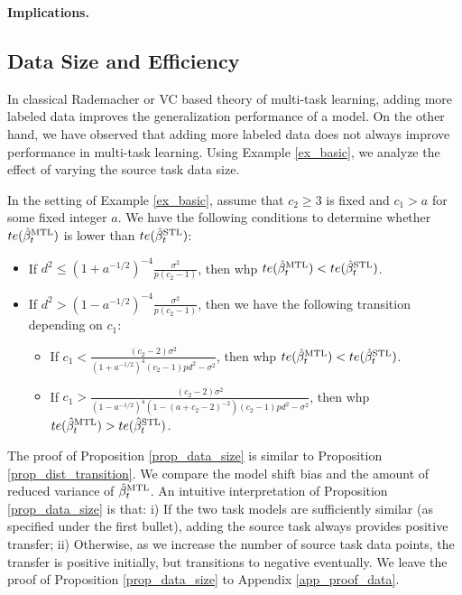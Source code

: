 \textbf{Implications.} 

\subsection{Data Size and Efficiency}

In classical Rademacher or VC based theory of multi-task learning, adding more labeled data improves the generalization performance of a model.
On the other hand, we have observed that adding more labeled data does not always improve performance in multi-task learning.
Using Example \ref{ex_basic}, we analyze the effect of varying the source task data size.

\begin{proposition}\label{prop_data_size}
	In the setting of Example \ref{ex_basic}, assume that $c_2  \ge 3$ is fixed and $c_1 > a$ for some fixed integer $a$.	We have the following conditions to determine whether $te(\hat{\beta}_t^{\text{MTL}})$ is lower than $te(\hat{\beta}_t^{\text{STL}})$:
	\begin{itemize}
\item If $d^2 \le (1 + a^{-1/2})^{-4}\frac{\sigma^2}{p(c_2-1)}$, then whp $te(\hat{\beta}_t^{\text{MTL}}) < te(\hat{\beta}_t^{\text{STL}})$. 
		 
\item If $d^2 > (1 - a^{-1/2})^{-4}\frac{\sigma^2}{p (c_2 - 1)}$, then we have the following transition depending on $c_1$:
		\begin{itemize}
			\item If $c_1 < \frac{(c_2-2)\sigma^2}{(1+a^{-1/2})^4(c_2 - 1) pd^2 - \sigma^2}$, then whp $te(\hat{\beta}_t^{\text{MTL}}) < te(\hat{\beta}_t^{\text{STL}})$.
			\item If $c_1 > \frac{(c_2-2) \sigma^2}{(1-a^{-1/2})^4(1-(a+c_2-2)^{-2})(c_2 - 1) pd^2 - \sigma^2}$, then whp $te(\hat{\beta}_t^{\text{MTL}}) > te(\hat{\beta}_t^{\text{STL}})$.
		\end{itemize}
	\end{itemize}
\end{proposition}

The proof of Proposition \ref{prop_data_size} is similar to Proposition \ref{prop_dist_transition}.
We compare the model shift bias and the amount of reduced variance of $\hat{\beta}_t^{\text{MTL}}$.
An intuitive interpretation of Proposition \ref{prop_data_size} is that:
i) If the two task models are sufficiently similar (as specified under the first bullet), adding the source task always provides positive transfer;
ii) Otherwise, as we increase the number of source task data points, the transfer is positive initially, but transitions to negative eventually.
We leave the proof of Proposition \ref{prop_data_size} to Appendix \ref{app_proof_data}.

